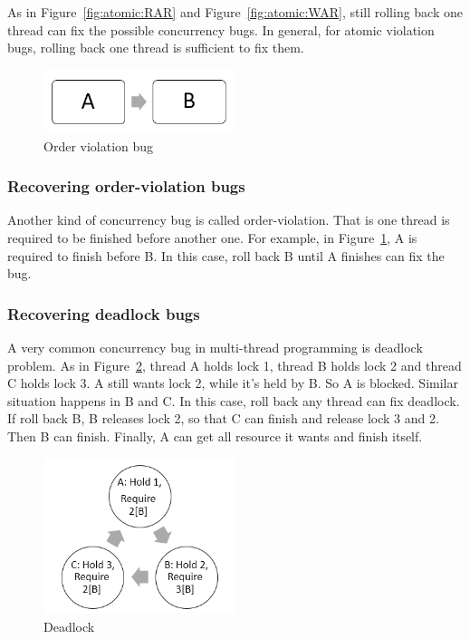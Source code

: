 As in Figure~\ref{fig:atomic:RAR} and Figure~\ref{fig:atomic:WAR}, still rolling back one thread can fix the possible concurrency bugs. In general, for atomic violation bugs, rolling back one thread is sufficient to fix them.

\begin{figure}[t]
\centering
\includegraphics[width=0.5\textwidth]{figs/order_violation.png}
\caption{Order violation bug}
\label{order violation}
\end{figure}

\subsubsection{Recovering order-violation bugs}
Another kind of concurrency bug is called order-violation. That is one thread is required to be finished before another one. For example, in Figure~\ref{order violation}, A is required to finish before B. In this case, roll back B until A finishes can fix the bug.

\subsubsection{Recovering deadlock bugs}
A very common concurrency bug in multi-thread programming is deadlock problem. As in Figure~\ref{deadlock}, thread A holds lock 1, thread B holds lock 2 and thread C holds lock 3. A still wants lock 2, while it's held by B. So A is blocked. Similar situation happens in B and C. In this case, roll back any thread can fix deadlock. If roll back B, B releases lock 2, so that C can finish and release lock 3 and 2. Then B can finish. Finally, A can get all resource it wants and finish itself.
\begin{figure}[t]
\centering
\includegraphics[width=0.5\textwidth]{figs/deadlock.png}
\caption{Deadlock}
\label{deadlock}
\end{figure}


